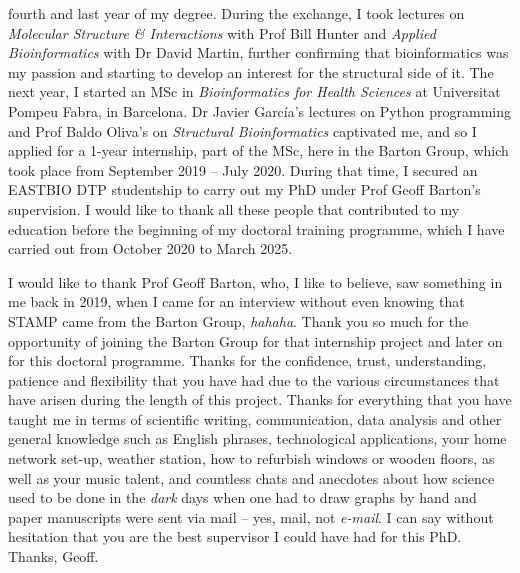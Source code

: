 fourth and last year of my degree. During the exchange, I took lectures on \textit{Molecular Structure \& Interactions} with Prof Bill Hunter and \textit{Applied Bioinformatics} with Dr David Martin, further confirming that bioinformatics was my passion and starting to develop an interest for the structural side of it. The next year, I started an MSc in \textit{Bioinformatics for Health Sciences} at Universitat Pompeu Fabra, in Barcelona. Dr Javier García's lectures on Python programming and Prof Baldo Oliva's on \textit{Structural Bioinformatics} captivated me, and so I applied for a 1-year internship, part of the MSc, here in the Barton Group, which took place from September 2019 -- July 2020. During that time, I secured an EASTBIO DTP studentship to carry out my PhD under Prof Geoff Barton's supervision. I would like to thank all these people that contributed to my education before the beginning of my doctoral training programme, which I have carried out from October 2020 to March 2025.

I would like to thank Prof Geoff Barton, who, I like to believe, saw something in me back in 2019, when I came for an interview without even knowing that STAMP came from the Barton Group, \textit{hahaha}. Thank you so much for the opportunity of joining the Barton Group for that internship project and later on for this doctoral programme. Thanks for the confidence, trust, understanding, patience and flexibility that you have had due to the various circumstances that have arisen during the length of this project. Thanks for everything that you have taught me in terms of scientific writing, communication, data analysis and other general knowledge such as English phrases, technological applications, your home network set-up, weather station, how to refurbish windows or wooden floors, as well as your music talent, and countless chats and anecdotes about how science used to be done in the \textit{dark} days when one had to draw graphs by hand and paper manuscripts were sent via mail -- yes, mail, not \textit{e-mail}. I can say without hesitation that you are the best supervisor I could have had for this PhD. Thanks, Geoff.

